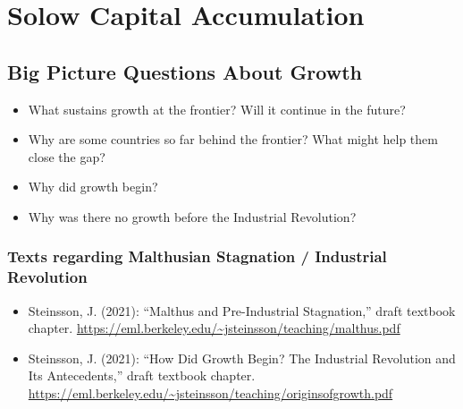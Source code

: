 \documentclass[12pt]{article}
\begin{document}
\newpage
\section{Solow Capital Accumulation}

\subsection*{Big Picture Questions About Growth}
\begin{itemize}
    \item What sustains growth at the frontier? Will it continue in the future?
    \item Why are some countries so far behind the frontier? What might help them close the gap?
    \item Why did growth begin?
    \item Why was there no growth before the Industrial Revolution?
\end{itemize}

\subsubsection*{Texts regarding Malthusian Stagnation / Industrial Revolution}
\begin{itemize}
    \item Steinsson, J. (2021): “Malthus and Pre-Industrial Stagnation,”
draft textbook chapter. \url{https://eml.berkeley.edu/~jsteinsson/teaching/malthus.pdf}
    \item Steinsson, J. (2021): “How Did Growth Begin? The Industrial
Revolution and Its Antecedents,” draft textbook chapter.
\url{https://eml.berkeley.edu/~jsteinsson/teaching/originsofgrowth.pdf}
\end{itemize}
\end{document}
